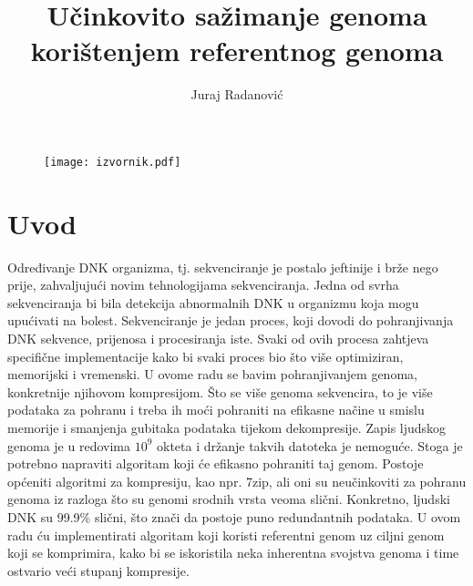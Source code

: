 \documentclass[times, utf8, diplomski]{fer}
\begin{document}

\title{Učinkovito sažimanje genoma korištenjem referentnog genoma}

\author{Juraj Radanović}

\maketitle

\begin{figure} [H]
	\texttt{[image: izvornik.pdf]}
\end{figure}
\thispagestyle{empty}

\tableofcontents

\chapter{Uvod}
Određivanje DNK organizma, tj. sekvenciranje je postalo jeftinije i brže nego prije, zahvaljujući novim tehnologijama sekvenciranja. Jedna od svrha sekvenciranja bi bila detekcija abnormalnih DNK u organizmu koja mogu upućivati na bolest. Sekvenciranje je jedan proces, koji dovodi do pohranjivanja DNK sekvence, prijenosa i procesiranja iste. Svaki od ovih procesa zahtjeva specifične implementacije kako bi svaki proces bio što više optimiziran, memorijski i vremenski. U ovome radu se bavim pohranjivanjem genoma, konkretnije njihovom kompresijom. Što se više genoma sekvencira, to je više podataka za pohranu i treba ih moći pohraniti na efikasne načine u smislu memorije i smanjenja gubitaka podataka tijekom dekompresije. Zapis ljudskog genoma je u redovima $10^{9}$  okteta i držanje takvih datoteka je nemoguće. Stoga je potrebno napraviti algoritam koji će efikasno pohraniti taj genom. Postoje općeniti algoritmi za kompresiju, kao npr. 7zip, ali oni su neučinkoviti za pohranu genoma iz razloga što su genomi srodnih vrsta veoma slični. Konkretno, ljudski DNK su 99.9\% slični, što znači da postoje puno redundantnih podataka. U ovom radu ću implementirati algoritam koji koristi referentni genom uz ciljni genom koji se komprimira, kako bi se iskoristila neka inherentna svojstva genoma i time ostvario veći stupanj kompresije.
\end{document}
